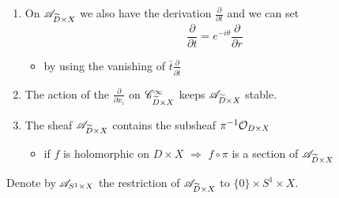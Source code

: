\begin{enumerate}
  \item On $\mathscr{A}_{\widetilde D\times X}$ we also have the derivation
    $\frac{\partial}{\partial t}$ and we can set
    \[
      \frac{\partial}{\partial t}=e^{-i\theta}\frac{\partial}{\partial r}
    \]
    \begin{itemize}
      \item by using the vanishing of $\bar t\frac{\partial}{\partial\bar t}$
    \end{itemize}
  \item The action of the $\frac{\partial}{\partial x_i}$ on
    $\mathscr{C}_{\widetilde D\times X}^\infty$ keeps $\mathscr{A}_{\widetilde D\times X}$ stable.
  \item The sheaf $\mathscr{A}_{\widetilde D\times X}$ contains the subsheaf
    $\pi^{-1}\mathcal{O}_{D\times X}$
    \begin{itemize}
      \item if $f$ is holomorphic on $D\times X$ $\Rightarrow$ $f\circ\pi$ is
        a section of $\mathscr{A}_{\widetilde D\times X}$
    \end{itemize}
\end{enumerate}
Denote by $\mathscr{A}_{S^1\times X}$ the restriction of $\mathscr{A}_{\widetilde D\times X}$ to
$\{0\}\times S^1\times X$.
\begin{comment}
  See \cite{sabbah2000equations} appendix B.1.4 for \textbf{Sheaf $\to$ Matrix}.
\end{comment}
